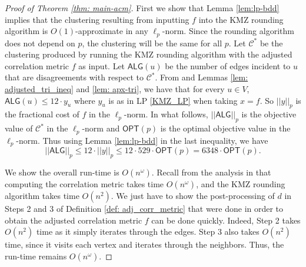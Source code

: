 \documentclass[11pt]{article}
\begin{document}
\begin{proof}[Proof of Theorem \ref{thm: main-acm}]
First we show that Lemma \ref{lem:lp-bdd} implies that the clustering resulting from inputting $f$ into the KMZ rounding algorithm is $O(1)$-approximate in any $\ell_p$-norm. Since the rounding algorithm does not depend on $p$, the clustering will be the same for all $p$. 
Let $\mathcal{C^*}$ be the clustering produced by running the KMZ rounding algorithm with the adjusted correlation metric $f$ as input. Let $\textsf{ALG}(u)$ be the number of edges incident to $u$ that are disagreements with respect to $\mathcal{C}^*$. From \cite{KMZ19} and Lemmas \ref{lem: adjusted_tri_ineq} and \ref{lem: apx-tri}, we have that for every $u \in V$,
$\textsf{ALG}(u) \leq 12 \cdot y_u$
where $y_u$ is as in LP \ref{KMZ_LP} when taking $x=f$. 
So $||y||_p$ is the fractional cost of $f$ in the $\ell_p$-norm. 
In what follows, $||\textsf{ALG}||_p$ is the objective value of $\mathcal{C}^*$ in the $\ell_p$-norm and $\textsf{OPT}(p)$ is the optimal objective value in the $\ell_p$-norm. 
Thus using Lemma \ref{lem:lp-bdd} in the last inequality, we have 
\[||\textsf{ALG}||_p \leq 12 \cdot ||y||_p \leq 12 \cdot 529 \cdot \textsf{OPT}(p) = 6348 \cdot \textsf{OPT}(p).\]


We show the overall run-time is $O(n^\omega)$. Recall from the analysis in \cite{DMN23} that computing the correlation metric takes time $O(n^\omega)$, and the KMZ rounding algorithm takes time $O(n^2)$. We just have to show the post-processing of $d$ in Steps 2 and 3 of Definition \ref{def: adj_corr_metric} that were done in order to obtain the adjusted correlation metric $f$ can be done quickly. Indeed, Step 2 takes $O(n^2)$ time as it simply iterates through the edges. Step 3 also takes $O(n^2)$ time, since it visits each vertex and iterates through the neighbors. Thus, the run-time remains $O(n^\omega)$. 
\end{proof}
\end{document}
